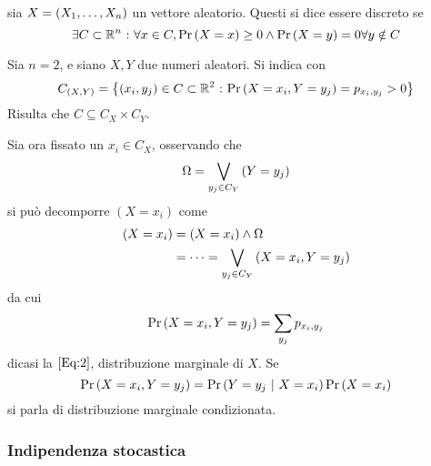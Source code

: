 \documentclass{subfiles}
\begin{document}
\begin{Definition*}
    sia \(X = \Tuple{X}{1}{n}\) un vettore aleatorio.
    Questi si dice essere discreto se
    \[
        \exists C \subset \Real^{n} \Such \forall x \in C, \Prob{X = x} \ge 0 \land \Prob{X = y} = 0 \forall y \notin C
    \]\vspace{-10pt}
\end{Definition*}

Sia \(n = 2\), e siano \(X, Y\) due numeri aleatori. Si indica con
\[
    C_{(X, Y)} = \Set{(x_{i}, y_{j}) \in C \subset \Real^{2}}[\Prob{X = x_{i}, Y = y_{j}} = p_{x_{i}, y_{j}} > 0]
\]
Risulta che \(C \subseteq C_{X} \times C_{Y}\).

Sia ora fissato un \(x_{i} \in C_{X}\), osservando che
\[
    \Omega = \Bigvee*{Y = y_{j}}{y_{j} \in C_{Y}}
\]
si può decomporre \((X = x_{i})\) come
\[\begin{aligned}
        (X = x_{i}) & = (X = x_{i}) \land \Omega                                 \\
                    & = \cdots = \Bigvee*{X = x_{i}, Y = y_{j}}{y_{j} \in C_{Y}}
    \end{aligned}\]
da cui
\begin{equation}
    \Prob{X = x_{i}, Y = y_{j}} = \Sum{p_{x_{i}, y_{j}}}{y_{j}}
\end{equation}
dicasi la \(\eqref{Eq:2}\), distribuzione marginale di \(X\).
Se
\[
    \Prob{X = x_{i}, Y = y_{j}} = \Prob{Y = y_{j}}[X = x_{i}] \Prob{X = x_{i}}
\]
si parla di distribuzione marginale condizionata.

\subsubsection{Indipendenza stocastica}

\end{document}
